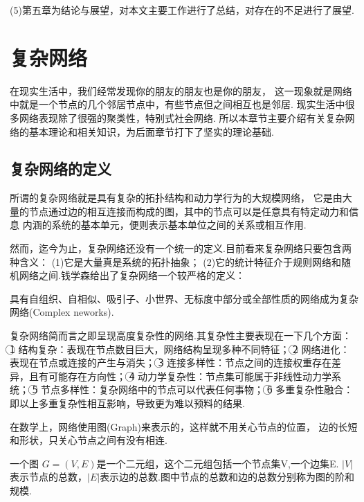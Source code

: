 \documentclass[bachelor,adobefonts]{jnuthesis}
\begin{document}
(5)第五章为结论与展望，对本文主要工作进行了总结，对存在的不足进行了展望.





\chapter{复杂网络}
在现实生活中，我们经常发现你的朋友的朋友也是你的朋友，
这一现象就是网络中就是一个节点的几个邻居节点中，有些节点但之间相互也是邻居.
现实生活中很多网络表现除了很强的聚类性，特别式社会网络.
所以本章节主要介绍有关复杂网络的基本理论和相关知识，为后面章节打下了坚实的理论基础.

\section{复杂网络的定义}
所谓的复杂网络就是具有复杂的拓扑结构和动力学行为的大规模网络，
它是由大量的节点通过边的相互连接而构成的图，其中的节点可以是任意具有特定动力和信息
内涵的系统的基本单元，便则表示基本单位之间的关系或相互作用.

然而，迄今为止，复杂网络还没有一个统一的定义.目前看来复杂网络只要包含两种含义：
(1)它是大量真是系统的拓扑抽象；
(2)它的统计特征介于规则网络和随机网络之间.钱学森给出了复杂网络一个较严格的定义：

\begin{definition}  
  具有自组织、自相似、吸引子、小世界、无标度中部分或全部性质的网络成为复杂网络(Complex neworks).  
\end{definition} 

复杂网络简而言之即呈现高度复杂性的网络.其复杂性主要表现在一下几个方面：
\textcircled{1} 结构复杂：表现在节点数目巨大，网络结构呈现多种不同特征；
\textcircled{2} 网络进化：表现在节点或连接的产生与消失；
\textcircled{3} 连接多样性：节点之间的连接权重存在差异，且有可能存在方向性；
\textcircled{4} 动力学复杂性：节点集可能属于非线性动力学系统；
\textcircled{5} 节点多样性：复杂网络中的节点可以代表任何事物；
\textcircled{6} 多重复杂性融合：即以上多重复杂性相互影响，导致更为难以预料的结果.

在数学上，网络使用图(Graph)来表示的，这样就不用关心节点的位置，
边的长短和形状，只关心节点之间有没有相连.

\begin{definition}  
  一个图 $G = (V,E)$是一个二元组，这个二元组包括一个节点集V,一个边集E.
  $|V|$表示节点的总数，$|E|$表示边的总数.图中节点的总数和边的总数分别称为图的阶和规模.
\end{definition} 
\end{document}
